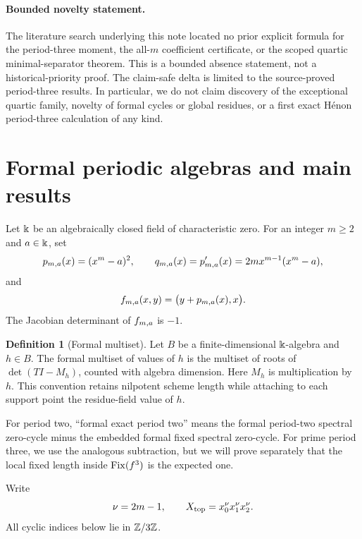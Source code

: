 \documentclass[11pt]{article}
\theoremstyle{definition}
\newtheorem{definition}[theorem]{Definition}
\theoremstyle{remark}
\begin{document}
\paragraph{Bounded novelty statement.}
The literature search underlying this note located no prior explicit formula
for the period-three moment, the all-\(m\) coefficient certificate, or the
scoped quartic minimal-separator theorem.  This is a bounded absence
statement, not a historical-priority proof.  The claim-safe delta is limited
to the source-proved period-three results.  In particular, we do not claim
discovery of the exceptional quartic family, novelty of formal cycles or
global residues, or a first exact H\'enon period-three calculation of any
kind.

\section{Formal periodic algebras and main results}
\label{sec:setup}

Let \(\Bbbk\) be an algebraically closed field of characteristic zero.  For
an integer \(m\ge2\) and \(a\in\Bbbk\), set
\begin{equation}
p_{m,a}(x)=(x^m-a)^2,
\qquad
q_{m,a}(x)=p_{m,a}'(x)=2m x^{m-1}(x^m-a),
\label{eq:family-polynomials}
\end{equation}
and
\begin{equation}
f_{m,a}(x,y)=\bigl(y+p_{m,a}(x),x\bigr).
\label{eq:family-map}
\end{equation}
The Jacobian determinant of \(f_{m,a}\) is \(-1\).

\begin{definition}[Formal multiset]
Let \(B\) be a finite-dimensional \(\Bbbk\)-algebra and \(h\in B\).  The
formal multiset of values of \(h\) is the multiset of roots of
\(\det(TI-M_h)\), counted with algebra dimension.  Here \(M_h\) is
multiplication by \(h\).  This convention retains nilpotent scheme length
while attaching to each support point the residue-field value of \(h\).
\end{definition}

For period two, ``formal exact period two'' means the formal period-two
spectral zero-cycle minus the embedded formal fixed spectral zero-cycle.  For
prime period three, we use the analogous subtraction, but we will prove
separately that the local fixed length inside \(\operatorname{Fix}(f^3)\) is the expected
one.

Write
\begin{equation}
\nu=2m-1,
\qquad
X_{\mathrm{top}}=x_0^\nu x_1^\nu x_2^\nu.
\label{eq:nu-top}
\end{equation}
All cyclic indices below lie in \(\mathbb{Z}/3\mathbb{Z}\).
\end{document}
